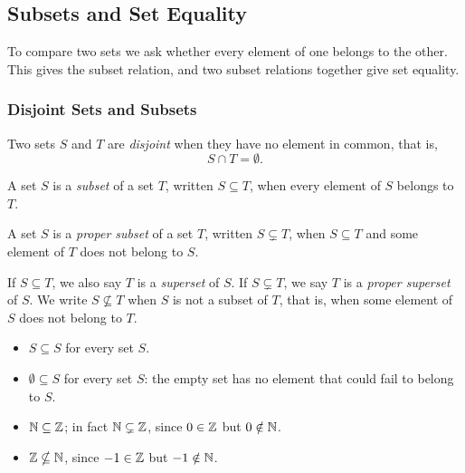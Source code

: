 \subsection{Subsets and Set Equality}
To compare two sets we ask whether every element of one belongs to the other.
This gives the subset relation, and two subset relations together give set
equality.

\subsubsection{Disjoint Sets and Subsets}
\begin{definition}[Disjoint]
    Two sets $S$ and $T$ are \emph{disjoint} when they have no element in
    common, that is,
    \begin{equation*}
        S \cap T = \emptyset.
    \end{equation*}
\end{definition}

\begin{definition}[Subset]
    A set $S$ is a \emph{subset} of a set $T$, written $S \subseteq T$, when
    every element of $S$ belongs to $T$.
\end{definition}

\begin{definition}
    A set $S$ is a \emph{proper subset} of a set $T$, written
    $S \subsetneq T$, when $S \subseteq T$ and some element of $T$ does not
    belong to $S$.
\end{definition}

\begin{remark}
    If $S \subseteq T$, we also say $T$ is a \emph{superset} of $S$. If
    $S \subsetneq T$, we say $T$ is a \emph{proper superset} of $S$. We
    write $S \nsubseteq T$ when $S$ is not a subset of $T$, that is, when
    some element of $S$ does not belong to $T$.
\end{remark}

\begin{example}
    \begin{itemize}
        \item $S \subseteq S$ for every set $S$.
        \item $\emptyset \subseteq S$ for every set $S$: the empty set has no
        element that could fail to belong to $S$.
        \item $\mathbb{N} \subseteq \mathbb{Z}$; in fact $\mathbb{N} \subsetneq \mathbb{Z}$, since $0\in\mathbb{Z}$
        but $0\notin\mathbb{N}$.
        \item $\mathbb{Z} \nsubseteq \mathbb{N}$, since $-1\in\mathbb{Z}$ but $-1\notin\mathbb{N}$.
    \end{itemize}
\end{example}


